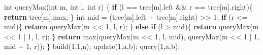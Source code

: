 \documentclass[
]{article}
\newenvironment{Shaded}{}{}
\newcommand{\ControlFlowTok}[1]{\textcolor[rgb]{0.00,0.44,0.13}{\textbf{#1}}}
\newcommand{\DataTypeTok}[1]{\textcolor[rgb]{0.56,0.13,0.00}{#1}}
\newcommand{\DecValTok}[1]{\textcolor[rgb]{0.25,0.63,0.44}{#1}}
\newcommand{\NormalTok}[1]{#1}
\newcommand{\OperatorTok}[1]{\textcolor[rgb]{0.40,0.40,0.40}{#1}}
\begin{document}
\begin{Shaded}
\begin{Highlighting}[]
\DataTypeTok{int}\NormalTok{ queryMax}\OperatorTok{(}\DataTypeTok{int}\NormalTok{ m}\OperatorTok{,} \DataTypeTok{int}\NormalTok{ l}\OperatorTok{,} \DataTypeTok{int}\NormalTok{ r}\OperatorTok{)}
\OperatorTok{\{}
    \ControlFlowTok{if} \OperatorTok{(}\NormalTok{l }\OperatorTok{==}\NormalTok{ tree}\OperatorTok{[}\NormalTok{m}\OperatorTok{].}\NormalTok{left }\OperatorTok{\&\&}\NormalTok{ r }\OperatorTok{==}\NormalTok{ tree}\OperatorTok{[}\NormalTok{m}\OperatorTok{].}\NormalTok{right}\OperatorTok{)\{}
        \ControlFlowTok{return}\NormalTok{ tree}\OperatorTok{[}\NormalTok{m}\OperatorTok{].}\NormalTok{max}\OperatorTok{;}
    \OperatorTok{\}}
    \DataTypeTok{int}\NormalTok{ mid }\OperatorTok{=} \OperatorTok{(}\NormalTok{tree}\OperatorTok{[}\NormalTok{m}\OperatorTok{].}\NormalTok{left }\OperatorTok{+}\NormalTok{ tree}\OperatorTok{[}\NormalTok{m}\OperatorTok{].}\NormalTok{right}\OperatorTok{)} \OperatorTok{\textgreater{}\textgreater{}} \DecValTok{1}\OperatorTok{;}
    \ControlFlowTok{if} \OperatorTok{(}\NormalTok{r }\OperatorTok{\textless{}=}\NormalTok{ mid}\OperatorTok{)\{}
        \ControlFlowTok{return}\NormalTok{ queryMax}\OperatorTok{(}\NormalTok{m }\OperatorTok{\textless{}\textless{}} \DecValTok{1}\OperatorTok{,}\NormalTok{ l}\OperatorTok{,}\NormalTok{ r}\OperatorTok{);}
    \OperatorTok{\}}
    \ControlFlowTok{else} \ControlFlowTok{if} \OperatorTok{(}\NormalTok{l }\OperatorTok{\textgreater{}}\NormalTok{ mid}\OperatorTok{)\{}
        \ControlFlowTok{return}\NormalTok{ queryMax}\OperatorTok{(}\NormalTok{m }\OperatorTok{\textless{}\textless{}} \DecValTok{1} \OperatorTok{|} \DecValTok{1}\OperatorTok{,}\NormalTok{ l}\OperatorTok{,}\NormalTok{ r}\OperatorTok{);}
    \OperatorTok{\}}
    \ControlFlowTok{return}\NormalTok{ max}\OperatorTok{(}\NormalTok{queryMax}\OperatorTok{(}\NormalTok{m }\OperatorTok{\textless{}\textless{}} \DecValTok{1}\OperatorTok{,}\NormalTok{ l}\OperatorTok{,}\NormalTok{ mid}\OperatorTok{),}\NormalTok{ queryMax}\OperatorTok{(}\NormalTok{m }\OperatorTok{\textless{}\textless{}} \DecValTok{1} \OperatorTok{|} \DecValTok{1}\OperatorTok{,}\NormalTok{ mid }\OperatorTok{+} \DecValTok{1}\OperatorTok{,}\NormalTok{ r}\OperatorTok{));}
\OperatorTok{\}} 
\NormalTok{build}\OperatorTok{(}\DecValTok{1}\OperatorTok{,}\DecValTok{1}\OperatorTok{,}\NormalTok{n}\OperatorTok{);}  
\NormalTok{update}\OperatorTok{(}\DecValTok{1}\OperatorTok{,}\NormalTok{a}\OperatorTok{,}\NormalTok{b}\OperatorTok{);}  
\NormalTok{query}\OperatorTok{(}\DecValTok{1}\OperatorTok{,}\NormalTok{a}\OperatorTok{,}\NormalTok{b}\OperatorTok{);}  
\end{Highlighting}
\end{Shaded}
\end{document}

